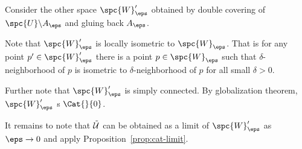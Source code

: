 Consider the other space $\spc{W}'_\eps$ obtained by double covering of $\spc{U}\backslash A_\eps$ and gluing back $A_\eps$.

Note that $\spc{W}'_\eps$ is locally isometric to $\spc{W}_\eps$. 
That is for any point $p'\in\spc{W}'_\eps$ there is a point $p\in\spc{W}_\eps$ such that $\delta$-neighborhood of $p$ is isometric to $\delta$-neighborhood of $p$ for all small $\delta>0$.

Further note that $\spc{W}'_\eps$ is simply connected.
By globalization theorem, $\spc{W}'_\eps$ s $\Cat{}{0}$.

It remains to note that $\tilde{\mathcal{U}}$ can be obtained as a limit of $\spc{W}'_\eps$ as $\eps\to 0$ and apply Proposition~\ref{prop:cat-limit}.
\qeds



